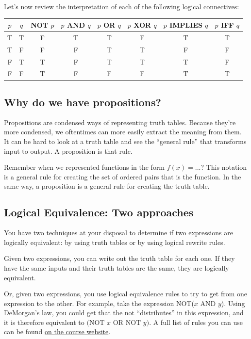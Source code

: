 \documentclass[12pt,letterpaper]{article}
\begin{document}
Let's now review the interpretation of each of the following logical connectives:    

\begin{tabular}{c|c|c|c|c|c|c|c}
 $p$ & $q$ & NOT $ p$ & $p$ AND $q$ & $p$ OR $q$ & $p$ XOR $q$ & $p$ IMPLIES $q$ & $p$ IFF $q$\\
\hline
T & T & F & T & T & F & T & T\\
T & F & F & F & T & T & F & F\\
F & T & T & F & T & T & T & F\\
F & F & T & F & F & F & T & T
\end{tabular}

\subsection*{Why do we have propositions?} 

Propositions are condensed ways of representing truth tables. Because they're more condensed, we oftentimes can more easily extract the meaning from them. It can be hard to look at a truth table and see the ``general rule'' that transforms input to output. A proposition is that rule. 

Remember when we represented functions in the form $f(x) = ...$? This notation is a general rule for creating the set of ordered pairs that is the function. In the same way, a proposition is a general rule for creating the truth table. 

	\subsection*{Logical Equivalence: Two approaches}
	
	You have two techniques at your disposal to determine if two expressions are logically equivalent: by using truth tables or by using logical rewrite rules.
	
	Given two expressions, you can write out the truth table for each one. If they have the same inputs and their truth tables are the same, they are logically equivalent.
	
	Or, given two expressions, you use logical equivalence rules to try to get from one expression to the other. For example, take the expression NOT($x$ AND $y$). Using DeMorgan's law, you could get that the not ``distributes'' in this expression, and it is therefore equivalent to $($NOT $ x $ OR $ $NOT $ y)$. A full list of rules you can use can be found \href{https://cs22.netlify.app/static/documents/logic.pdf}{on the course website}.
\end{document}
